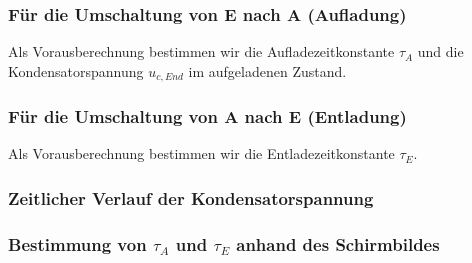 \documentclass[11pt,a4paper,titlepage]{article}
\begin{document}
\subsubsection{F\"ur die Umschaltung von E nach A (Aufladung)}
Als Vorausberechnung bestimmen wir die Aufladezeitkonstante $\tau_A$ und die Kondensatorspannung $u_{c, End}$ im aufgeladenen Zustand.

\subsubsection{F\"ur die Umschaltung von A nach E (Entladung)}
Als Vorausberechnung bestimmen wir die Entladezeitkonstante $\tau_E$.

\subsubsection{Zeitlicher Verlauf der Kondensatorspannung}

\subsubsection{Bestimmung von $\tau_A$ und $\tau_E$ anhand des Schirmbildes}
\end{document}
